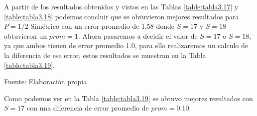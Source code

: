 A partir de los resultados obtenidos y vistos en las Tablas \ref{table:tabla3.17} y \ref{table:tabla3.18} podemos concluir que se obtuvieron mejores resultados para $P = 1/2$ Simétrico con un error promedio de 1.58 donde $S = 17$ y $S = 18$ obtuvieron un $prom = 1$.
\vskip 0.5cm
Ahora pasaremos a decidir el valor de $S = 17$ o $S = 18$, ya que ambos tienen de error promedio 1.0, para ello realizaremos un calculo de la diferencia de ese error, estos resultados se muestran en la Tabla \ref{table:tabla3.19}.
\vskip 0.5cm
\begin{center}
\begin{table}[H]
\centering
\caption{\small{Resultados del testeo del sistema para P = 1 simétrico con S = 17 y 18.}}
\label{table:tabla3.19}
\begin{center}
\vskip 0.1cm
{\small{Fuente: Elaboración propia}}
\end{center}
\end{table}
\end{center}
\vskip -0.7cm
Como podemos ver en la Tabla \ref{table:tabla3.19} se obtuvo mejores resultados con $S = 17$ con una diferencia de error promedio de $prom = 0.10$.

